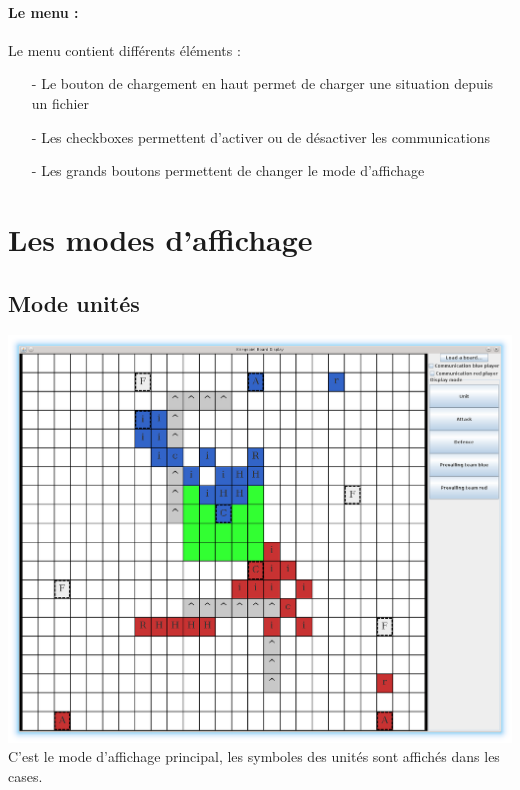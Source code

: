 		\paragraph{Le menu :}
	
			Le menu contient différents éléments :
			\begin{itemize}
			\item[-]Le bouton de chargement en haut permet de charger une situation depuis un fichier
			\item[-]Les checkboxes permettent d'activer ou de désactiver les communications
			\item[-]Les grands boutons permettent de changer le mode d'affichage
			\end{itemize}

	\section{Les modes d'affichage}

		\subsection{Mode unités}
			\includegraphics[scale=0.4]{images/screen1.eps}
			C'est le mode d'affichage principal, les symboles des unités sont affichés dans les cases.

			\clearpage

